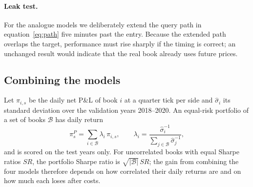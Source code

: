 \paragraph{Leak test.} For the analogue models we deliberately extend the query path in
equation~\eqref{eq:path} five minutes past the entry. Because the extended path overlaps the
target, performance must rise sharply if the timing is correct; an unchanged result would indicate
that the real book already uses future prices.

\subsection{Combining the models}\label{sec:model_portfolio}

Let $\pi_{i,s}$ be the daily net P\&L of book $i$ at a quarter tick per side and $\hat\sigma_i$ its
standard deviation over the validation years 2018--2020. An equal-risk portfolio of a set of books
$\mathcal{B}$ has daily return
\begin{equation}\label{eq:portfolio}
  \pi^{P}_s = \sum_{i\in\mathcal{B}} \lambda_i\,\pi_{i,s},\qquad
  \lambda_i=\frac{\hat\sigma_i^{-1}}{\sum_{j\in\mathcal{B}}\hat\sigma_j^{-1}},
\end{equation}
and is scored on the test years only. For uncorrelated books with equal Sharpe ratios $SR$, the
portfolio Sharpe ratio is $\sqrt{|\mathcal{B}|}\,SR$; the gain from combining the four models
therefore depends on how correlated their daily returns are and on how much each loses after costs.
